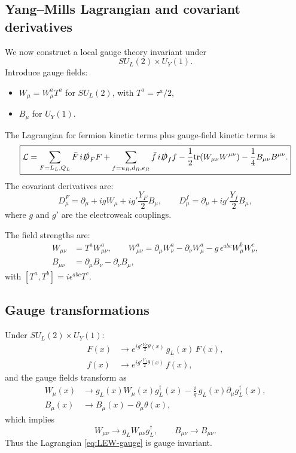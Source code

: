 \subsection{Yang--Mills Lagrangian and covariant derivatives}
We now construct a local gauge theory invariant under
\[
SU_L(2)\times U_Y(1).
\]
Introduce gauge fields:
\begin{itemize}
  \item $W_\mu=W_\mu^a T^a$ for $SU_L(2)$, with $T^a=\tau^a/2$,
  \item $B_\mu$ for $U_Y(1)$.
\end{itemize}
The Lagrangian for fermion kinetic terms plus gauge-field kinetic terms is
\begin{equation}
\boxed{
\mathcal L
=
\sum_{F=L_L,Q_L}\bar F\,i\slashed{D}_F F
+\sum_{f=u_R,d_R,e_R}\bar f\,i\slashed{D}_f f
-\frac{1}{2}\mathrm{tr}(W_{\mu\nu}W^{\mu\nu})
-\frac{1}{4}B_{\mu\nu}B^{\mu\nu}.
}
\label{eq:LEW-gauge}
\end{equation}
The covariant derivatives are:
\begin{equation}
\boxed{
D_\mu^F = \partial_\mu + ig W_\mu + ig'\frac{Y_F}{2}B_\mu,
\qquad
D_\mu^f = \partial_\mu + ig'\frac{Y_f}{2}B_\mu,
}
\label{eq:cov-der}
\end{equation}
where $g$ and $g'$ are the electroweak couplings.

The field strengths are:
\begin{align}
W_{\mu\nu}&=T^a W^a_{\mu\nu},\qquad
W^a_{\mu\nu}=\partial_\mu W^a_\nu-\partial_\nu W^a_\mu-g\,\epsilon^{abc}W^b_\mu W^c_\nu,\\
B_{\mu\nu}&=\partial_\mu B_\nu-\partial_\nu B_\mu,
\end{align}
with $[T^a,T^b]=i\epsilon^{abc}T^c$.

\subsection{Gauge transformations}
Under $SU_L(2)\times U_Y(1)$:
\begin{align}
F(x)&\to e^{ig'\frac{Y_F}{2}\theta(x)}\,g_L(x)\,F(x),\\
f(x)&\to e^{ig'\frac{Y_f}{2}\theta(x)}\,f(x),
\end{align}
and the gauge fields transform as
\begin{align}
W_\mu(x)&\to g_L(x)W_\mu(x)g_L^\dagger(x)-\frac{i}{g}\,g_L(x)\partial_\mu g_L^\dagger(x),\\
B_\mu(x)&\to B_\mu(x)-\partial_\mu\theta(x),
\end{align}
which implies
\[
W_{\mu\nu}\to g_L W_{\mu\nu} g_L^\dagger,
\qquad
B_{\mu\nu}\to B_{\mu\nu}.
\]
Thus the Lagrangian \eqref{eq:LEW-gauge} is gauge invariant.

